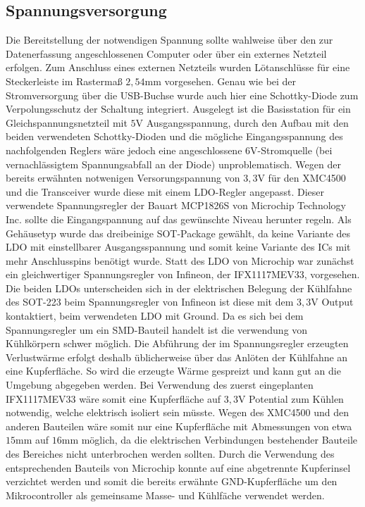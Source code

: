 \subsection{Spannungsversorgung}
Die Bereitstellung der notwendigen Spannung sollte wahlweise über den zur Datenerfassung angeschlossenen Computer oder über ein externes Netzteil erfolgen. Zum Anschluss eines externen Netzteils wurden Lötanschlüsse für eine Steckerleiste im Rastermaß $2,54$mm vorgesehen. Genau wie bei der Stromversorgung über die USB-Buchse wurde auch hier eine Schottky-Diode zum Verpolungsschutz der Schaltung integriert. Ausgelegt ist die Basisstation für ein Gleichspannungsnetzteil mit $5$V Ausgangsspannung, durch den Aufbau mit den beiden verwendeten Schottky-Dioden und die mögliche Eingangsspannung des nachfolgenden Reglers wäre jedoch eine angeschlossene $6$V-Stromquelle (bei vernachlässigtem Spannungsabfall an der Diode) unproblematisch.
Wegen der bereits erwähnten notwenigen Versorungspannung von $3,3$V für den XMC4500 und die Transceiver wurde diese mit einem \ac{LDO}-Regler angepasst. Dieser verwendete Spannungsregler der Bauart MCP1826S von Microchip Technology Inc. sollte die Eingangspannung auf das gewünschte Niveau herunter regeln.
Als Gehäusetyp wurde das dreibeinige \ac{SOT}-Package gewählt, da keine Variante des \ac{LDO} mit einstellbarer Ausgangsspannung und somit keine Variante des \acp{IC} mit mehr Anschlusspins benötigt wurde. Statt des \ac{LDO} von Microchip war zunächst ein gleichwertiger Spannungsregler von Infineon, der IFX1117MEV33, vorgesehen. Die beiden \acp{LDO} unterscheiden sich in der elektrischen Belegung der Kühlfahne des \ac{SOT}-223 beim Spannungsregler von Infineon ist diese mit dem $3,3$V Output kontaktiert, beim verwendeten \ac{LDO} mit Ground. Da es sich bei dem Spannungsregler um ein \ac{SMD}-Bauteil handelt ist die verwendung von Kühlkörpern schwer möglich. Die Abführung der im Spannungsregler erzeugten Verlustwärme erfolgt deshalb üblicherweise über das Anlöten der Kühlfahne an eine Kupferfläche. So wird die erzeugte Wärme gespreizt und kann gut an die Umgebung abgegeben werden. Bei Verwendung des zuerst eingeplanten IFX1117MEV33 wäre somit eine Kupferfläche auf $3,3$V Potential zum Kühlen notwendig, welche elektrisch isoliert sein müsste. Wegen des XMC4500 und den anderen Bauteilen wäre somit nur eine Kupferfläche mit Abmessungen von etwa $15$mm auf $16$mm möglich, da die elektrischen Verbindungen bestehender Bauteile des Bereiches nicht unterbrochen werden sollten. Durch die Verwendung des entsprechenden Bauteils von Microchip konnte auf eine abgetrennte Kupferinsel verzichtet werden und somit die bereits erwähnte GND-Kupferfläche um den Mikrocontroller als gemeinsame Masse- und Kühlfäche verwendet werden.%
